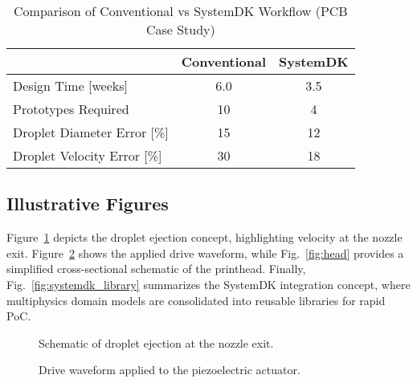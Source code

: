 \documentclass[conference]{IEEEtran}
\begin{document}
\begin{table}[t]
\centering
\caption{Comparison of Conventional vs SystemDK Workflow (PCB Case Study)}
\begin{tabular}{lcc}
\toprule
 & Conventional & SystemDK \\
\midrule
Design Time [weeks] & 6.0 & 3.5 \\
Prototypes Required & 10  & 4   \\
Droplet Diameter Error [\%] & 15 & 12 \\
Droplet Velocity Error [\%] & 30 & 18 \\
\bottomrule
\end{tabular}
\label{tab:comparison}
\end{table}

\subsection{Illustrative Figures}
Figure~\ref{fig:droplet} depicts the droplet ejection concept, highlighting velocity at the nozzle exit.  
Figure~\ref{fig:waveform} shows the applied drive waveform, while Fig.~\ref{fig:head} provides a simplified cross-sectional schematic of the printhead.  
Finally, Fig.~\ref{fig:systemdk_library} summarizes the SystemDK integration concept, where multiphysics domain models are consolidated into reusable libraries for rapid PoC.

\begin{figure}[t]
\centering
{}
\caption{Schematic of droplet ejection at the nozzle exit.}
\label{fig:droplet}
\end{figure}

\begin{figure}[t]
\centering
{}
\caption{Drive waveform applied to the piezoelectric actuator.}
\label{fig:waveform}
\end{figure}
\end{document}
